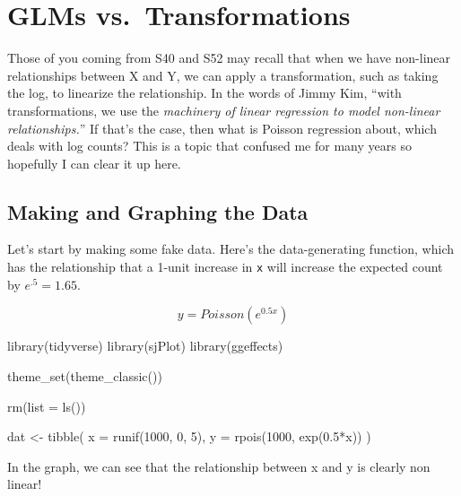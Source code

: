 \documentclass[
  letterpaper,
  DIV=11,
  numbers=noendperiod]{scrreprt}
\newenvironment{Shaded}{\begin{snugshade}}{\end{snugshade}}
\newcommand{\AttributeTok}[1]{\textcolor[rgb]{0.49,0.56,0.16}{#1}}
\newcommand{\DecValTok}[1]{\textcolor[rgb]{0.25,0.63,0.44}{#1}}
\newcommand{\FloatTok}[1]{\textcolor[rgb]{0.25,0.63,0.44}{#1}}
\newcommand{\FunctionTok}[1]{\textcolor[rgb]{0.02,0.16,0.49}{#1}}
\newcommand{\NormalTok}[1]{\textcolor[rgb]{0.00,0.44,0.13}{#1}}
\newcommand{\OtherTok}[1]{\textcolor[rgb]{0.00,0.44,0.13}{#1}}
\newcommand{\SpecialCharTok}[1]{\textcolor[rgb]{0.25,0.44,0.63}{#1}}
\begin{document}
\hypertarget{glms-vs.-transformations}{%
\chapter{GLMs vs.~Transformations}\label{glms-vs.-transformations}}

Those of you coming from S40 and S52 may recall that when we have
non-linear relationships between X and Y, we can apply a transformation,
such as taking the log, to linearize the relationship. In the words of
Jimmy Kim, ``with transformations, we use the \emph{machinery of linear
regression to model non-linear relationships.}'' If that's the case,
then what is Poisson regression about, which deals with log counts? This
is a topic that confused me for many years so hopefully I can clear it
up here.

\hypertarget{making-and-graphing-the-data}{%
\section{Making and Graphing the
Data}\label{making-and-graphing-the-data}}

Let's start by making some fake data. Here's the data-generating
function, which has the relationship that a 1-unit increase in
\texttt{x} will increase the expected count by \(e^.5 = 1.65\).

\[
y = Poisson(e^{0.5x})
\]

\begin{Shaded}
\begin{Highlighting}[]
\FunctionTok{library}\NormalTok{(tidyverse)}
\FunctionTok{library}\NormalTok{(sjPlot)}
\FunctionTok{library}\NormalTok{(ggeffects)}

\FunctionTok{theme\_set}\NormalTok{(}\FunctionTok{theme\_classic}\NormalTok{())}

\FunctionTok{rm}\NormalTok{(}\AttributeTok{list =} \FunctionTok{ls}\NormalTok{())}

\NormalTok{dat }\OtherTok{\textless{}{-}} \FunctionTok{tibble}\NormalTok{(}
  \AttributeTok{x =} \FunctionTok{runif}\NormalTok{(}\DecValTok{1000}\NormalTok{, }\DecValTok{0}\NormalTok{, }\DecValTok{5}\NormalTok{),}
  \AttributeTok{y =} \FunctionTok{rpois}\NormalTok{(}\DecValTok{1000}\NormalTok{, }\FunctionTok{exp}\NormalTok{(}\FloatTok{0.5}\SpecialCharTok{*}\NormalTok{x))}
\NormalTok{)}
\end{Highlighting}
\end{Shaded}

In the graph, we can see that the relationship between x and y is
clearly non linear!
\end{document}
